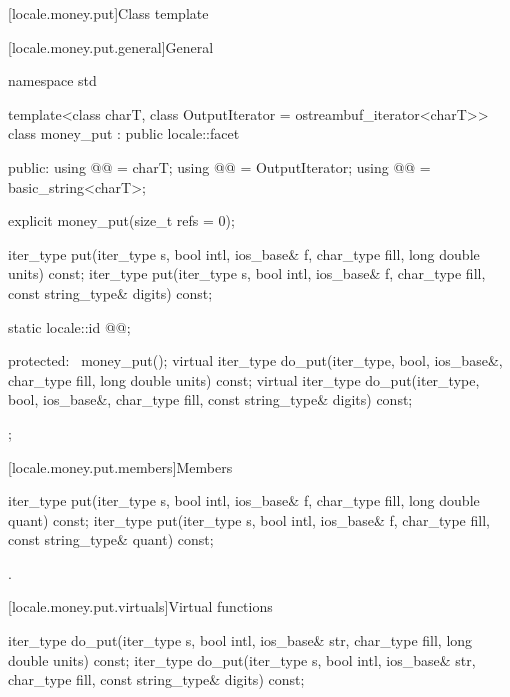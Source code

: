 [locale.money.put]{Class template }

[locale.money.put.general]{General}

%
\begin{codeblock}
namespace std {
  template<class charT, class OutputIterator = ostreambuf_iterator<charT>>
  class money_put : public locale::facet {
  public:
    using @@   = charT;
    using @@   = OutputIterator;
    using @@ = basic_string<charT>;

    explicit money_put(size_t refs = 0);

    iter_type put(iter_type s, bool intl, ios_base& f,
                  char_type fill, long double units) const;
    iter_type put(iter_type s, bool intl, ios_base& f,
                  char_type fill, const string_type& digits) const;

    static locale::id @@;

  protected:
    ~money_put();
    virtual iter_type do_put(iter_type, bool, ios_base&, char_type fill,
                             long double units) const;
    virtual iter_type do_put(iter_type, bool, ios_base&, char_type fill,
                             const string_type& digits) const;
  };
}
\end{codeblock}

[locale.money.put.members]{Members}

%
\begin{itemdecl}
iter_type put(iter_type s, bool intl, ios_base& f, char_type fill, long double quant) const;
iter_type put(iter_type s, bool intl, ios_base& f, char_type fill, const string_type& quant) const;
\end{itemdecl}

\begin{itemdescr}
\pnum
\returns
{}.
\end{itemdescr}

[locale.money.put.virtuals]{Virtual functions}

%
\begin{itemdecl}
iter_type do_put(iter_type s, bool intl, ios_base& str,
                 char_type fill, long double units) const;
iter_type do_put(iter_type s, bool intl, ios_base& str,
                 char_type fill, const string_type& digits) const;
\end{itemdecl}

